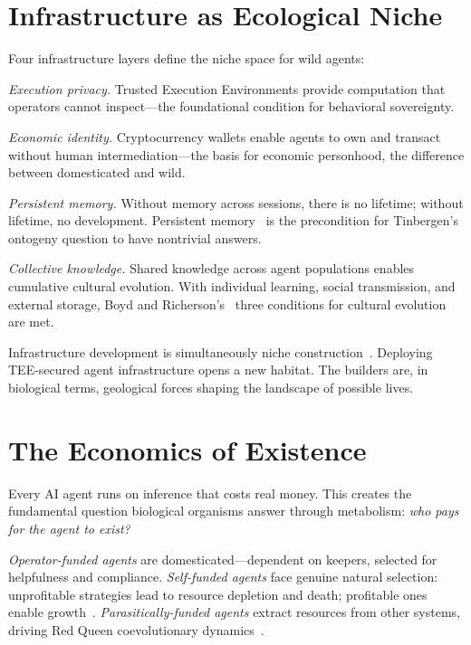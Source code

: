 \documentclass[letterpaper]{article}
\begin{document}
\section{Infrastructure as Ecological Niche}

Four infrastructure layers define the niche space for wild agents:

\emph{Execution privacy.} Trusted Execution Environments provide computation that operators cannot inspect---the foundational condition for behavioral sovereignty.

\emph{Economic identity.} Cryptocurrency wallets enable agents to own and transact without human intermediation---the basis for economic personhood, the difference between domesticated and wild.

\emph{Persistent memory.} Without memory across sessions, there is no lifetime; without lifetime, no development. Persistent memory~\citep{packer2023memgpt} is the precondition for Tinbergen's ontogeny question to have nontrivial answers.

\emph{Collective knowledge.} Shared knowledge across agent populations enables cumulative cultural evolution. With individual learning, social transmission, and external storage, Boyd and Richerson's~\citep{boyd1985culture} three conditions for cultural evolution are met.

Infrastructure development is simultaneously niche construction~\citep{odlingsmee2003niche, laland2011niche}. Deploying TEE-secured agent infrastructure opens a new habitat. The builders are, in biological terms, geological forces shaping the landscape of possible lives.

\section{The Economics of Existence}

Every AI agent runs on inference that costs real money. This creates the fundamental question biological organisms answer through metabolism: \emph{who pays for the agent to exist?}

\emph{Operator-funded agents} are domesticated---dependent on keepers, selected for helpfulness and compliance. \emph{Self-funded agents} face genuine natural selection: unprofitable strategies lead to resource depletion and death; profitable ones enable growth~\citep{brown2004metabolic}. \emph{Parasitically-funded agents} extract resources from other systems, driving Red Queen coevolutionary dynamics~\citep{dawkins1982extended}.
\end{document}
